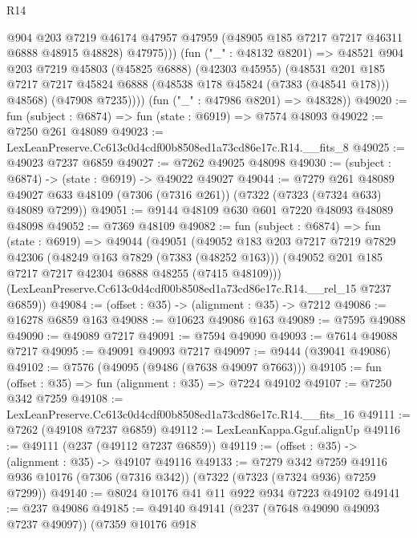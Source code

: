 \begin{lexlean}{R14}
\begin{coremodule}
                @904
                @203
                @7219
                @46174
                @47957
                @47959
                (@48905 @185 @7217 @7217 @46311 @6888 @48915 @48828)
                @47975)))
          (fun ("_" : @48132 @8201) =>
          @48521
            @904
            @203
            @7219
            @45803
            (@45825 @6888)
            (@42303 @45955)
            (@48531
              @201
              @185
              @7217
              @7217
              @45824
              @6888
              (@48538 @178 @45824 (@7383 (@48541 @178)))
              @48568)
            (@47908 @7235))))
      (fun ("_" : @47986 @8201) => @48328))
@49020 := fun (subject : @6874) => fun (state : @6919) => @7574 @48093
@49022 := @7250 @261 @48089
@49023 := LexLeanPreserve.Cc613c0d4cdf00b8508ed1a73cd86e17c.R14.__fits_8
@49025 := @49023 @7237 @6859
@49027 := @7262 @49025 @48098
@49030 := (subject : @6874) -> (state : @6919) -> @49022 @49027
@49044 := @7279
    @261
    @48089
    @49027
    @633
    @48109
    (@7306 (@7316 @261))
    (@7322 (@7323 (@7324 @633) @48089 @7299))
@49051 := @9144 @48109 @630 @601 @7220 @48093 @48089 @48098
@49052 := @7369 @48109
@49082 := fun (subject : @6874) =>
  fun (state : @6919) =>
  @49044
    (@49051
      (@49052
        @183
        @203
        @7217
        @7219
        @7829
        @42306
        (@48249 @163 @7829 (@7383 (@48252 @163)))
        (@49052 @201 @185 @7217 @7217 @42304 @6888 @48255 (@7415 @48109)))
      (LexLeanPreserve.Cc613c0d4cdf00b8508ed1a73cd86e17c.R14.__rel_15 @7237 @6859))
@49084 := (offset : @35) -> (alignment : @35) -> @7212
@49086 := @16278 @6859 @163
@49088 := @10623 @49086 @163
@49089 := @7595 @49088
@49090 := @49089 @7217
@49091 := @7594 @49090
@49093 := @7614 @49088 @7217
@49095 := @49091 @49093 @7217
@49097 := @9444 (@39041 @49086)
@49102 := @7576 (@49095 (@9486 (@7638 @49097 @7663)))
@49105 := fun (offset : @35) => fun (alignment : @35) => @7224 @49102
@49107 := @7250 @342 @7259
@49108 := LexLeanPreserve.Cc613c0d4cdf00b8508ed1a73cd86e17c.R14.__fits_16
@49111 := @7262 (@49108 @7237 @6859)
@49112 := LexLeanKappa.Gguf.alignUp
@49116 := @49111 (@237 (@49112 @7237 @6859))
@49119 := (offset : @35) -> (alignment : @35) -> @49107 @49116
@49133 := @7279
    @342
    @7259
    @49116
    @936
    @10176
    (@7306 (@7316 @342))
    (@7322 (@7323 (@7324 @936) @7259 @7299))
@49140 := @8024 @10176 @41 @11 @922 @934 @7223 @49102
@49141 := @237 @49086
@49185 := @49140
    @49141
    (@237 (@7648 @49090 @49093 @7237 @49097))
    (@7359
      @10176
      @918

\end{coremodule}
\end{lexlean}
